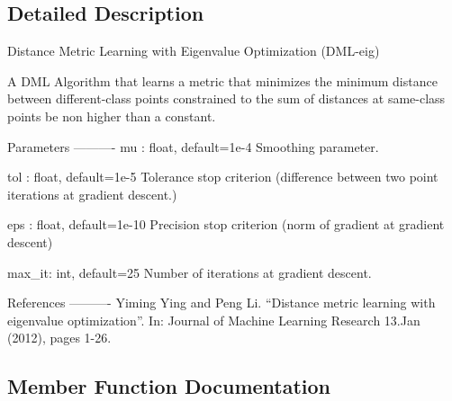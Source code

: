 \subsection{Detailed Description}
\begin{DoxyVerb}    Distance Metric Learning with Eigenvalue Optimization (DML-eig)

    A DML Algorithm that learns a metric that minimizes the minimum distance between different-class points
    constrained to the sum of distances at same-class points be non higher than a constant.

    Parameters
    ----------
    mu : float, default=1e-4
        Smoothing parameter.

    tol : float, default=1e-5
        Tolerance stop criterion (difference between two point iterations at gradient descent.)

    eps : float, default=1e-10
        Precision stop criterion (norm of gradient at gradient descent)

    max_it: int, default=25
        Number of iterations at gradient descent.

    References
    ----------
        Yiming Ying and Peng Li. “Distance metric learning with eigenvalue optimization”. In: Journal of
        Machine Learning Research 13.Jan (2012), pages 1-26.
\end{DoxyVerb}
 

\subsection{Member Function Documentation}
